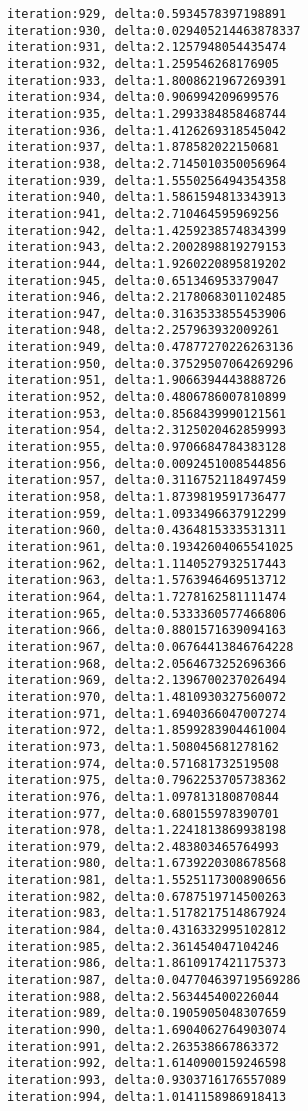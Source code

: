 \documentclass[11pt]{article}
\begin{document}
\begin{Verbatim}[commandchars=\\\{\}]
iteration:929, delta:0.5934578397198891
iteration:930, delta:0.029405214463878337
iteration:931, delta:2.1257948054435474
iteration:932, delta:1.259546268176905
iteration:933, delta:1.8008621967269391
iteration:934, delta:0.906994209699576
iteration:935, delta:1.2993384858468744
iteration:936, delta:1.4126269318545042
iteration:937, delta:1.878582022150681
iteration:938, delta:2.7145010350056964
iteration:939, delta:1.5550256494354358
iteration:940, delta:1.5861594813343913
iteration:941, delta:2.710464595969256
iteration:942, delta:1.4259238574834399
iteration:943, delta:2.2002898819279153
iteration:944, delta:1.9260220895819202
iteration:945, delta:0.651346953379047
iteration:946, delta:2.2178068301102485
iteration:947, delta:0.3163533855453906
iteration:948, delta:2.257963932009261
iteration:949, delta:0.47877270226263136
iteration:950, delta:0.37529507064269296
iteration:951, delta:1.9066394443888726
iteration:952, delta:0.4806786007810899
iteration:953, delta:0.8568439990121561
iteration:954, delta:2.3125020462859993
iteration:955, delta:0.9706684784383128
iteration:956, delta:0.0092451008544856
iteration:957, delta:0.3116752118497459
iteration:958, delta:1.8739819591736477
iteration:959, delta:1.0933496637912299
iteration:960, delta:0.4364815333531311
iteration:961, delta:0.19342604065541025
iteration:962, delta:1.1140527932517443
iteration:963, delta:1.5763946469513712
iteration:964, delta:1.7278162581111474
iteration:965, delta:0.5333360577466806
iteration:966, delta:0.8801571639094163
iteration:967, delta:0.06764413846764228
iteration:968, delta:2.0564673252696366
iteration:969, delta:2.1396700237026494
iteration:970, delta:1.4810930327560072
iteration:971, delta:1.6940366047007274
iteration:972, delta:1.8599283904461004
iteration:973, delta:1.508045681278162
iteration:974, delta:0.571681732519508
iteration:975, delta:0.7962253705738362
iteration:976, delta:1.097813180870844
iteration:977, delta:0.680155978390701
iteration:978, delta:1.2241813869938198
iteration:979, delta:2.483803465764993
iteration:980, delta:1.6739220308678568
iteration:981, delta:1.5525117300890656
iteration:982, delta:0.6787519714500263
iteration:983, delta:1.5178217514867924
iteration:984, delta:0.4316332995102812
iteration:985, delta:2.361454047104246
iteration:986, delta:1.8610917421175373
iteration:987, delta:0.047704639719569286
iteration:988, delta:2.563445400226044
iteration:989, delta:0.1905905048307659
iteration:990, delta:1.6904062764903074
iteration:991, delta:2.263538667863372
iteration:992, delta:1.6140900159246598
iteration:993, delta:0.9303716176557089
iteration:994, delta:1.0141158986918413

\end{Verbatim}
\end{document}
